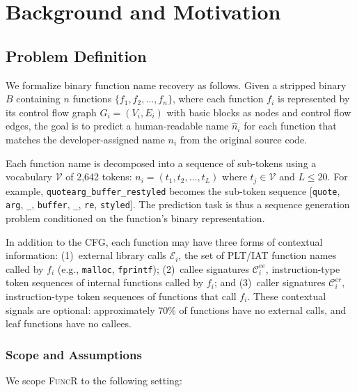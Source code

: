 \documentclass[sigconf,nonacm]{acmart}
\newcommand{\sysname}{\textsc{FuncR}}
\begin{document}
\section{Background and Motivation}
\label{sec:background}

\subsection{Problem Definition}
\label{sec:problem}

We formalize binary function name recovery as follows. Given a stripped binary $B$ containing $n$ functions $\{f_1, f_2, \ldots, f_n\}$, where each function $f_i$ is represented by its control flow graph $G_i = (V_i, E_i)$ with basic blocks as nodes and control flow edges, the goal is to predict a human-readable name $\hat{n}_i$ for each function that matches the developer-assigned name $n_i$ from the original source code.

Each function name is decomposed into a sequence of sub-tokens using a vocabulary $\mathcal{V}$ of 2,642 tokens: $n_i = (t_1, t_2, \ldots, t_L)$ where $t_j \in \mathcal{V}$ and $L \leq 20$. For example, \texttt{quotearg\_buffer\_restyled} becomes the sub-token sequence [\texttt{quote}, \texttt{arg}, \texttt{\_}, \texttt{buffer}, \texttt{\_}, \texttt{re}, \texttt{styled}]. The prediction task is thus a sequence generation problem conditioned on the function's binary representation.

In addition to the CFG, each function may have three forms of contextual information: (1)~external library calls $\mathcal{E}_i$, the set of PLT/IAT function names called by $f_i$ (e.g., \texttt{malloc}, \texttt{fprintf}); (2)~callee signatures $\mathcal{C}_i^{ee}$, instruction-type token sequences of internal functions called by $f_i$; and (3)~caller signatures $\mathcal{C}_i^{er}$, instruction-type token sequences of functions that call $f_i$. These contextual signals are optional: approximately 70\% of functions have no external calls, and leaf functions have no callees.

\subsubsection{Scope and Assumptions}

We scope \sysname{} to the following setting:
\end{document}
